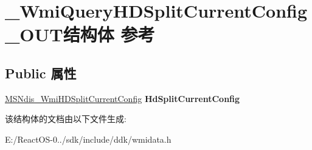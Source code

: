 \hypertarget{struct___wmi_query_h_d_split_current_config___o_u_t}{}\section{\+\_\+\+Wmi\+Query\+H\+D\+Split\+Current\+Config\+\_\+\+O\+U\+T结构体 参考}
\label{struct___wmi_query_h_d_split_current_config___o_u_t}
\subsection*{Public 属性}
\begin{DoxyCompactItemize}
\item 
\mbox{\label{struct___wmi_query_h_d_split_current_config___o_u_t_a3103e19f105575b0317ad8fd4fad4f9a}} 
\hyperlink{struct___m_s_ndis___wmi_h_d_split_current_config}{M\+S\+Ndis\+\_\+\+Wmi\+H\+D\+Split\+Current\+Config} {\bfseries Hd\+Split\+Current\+Config}
\end{DoxyCompactItemize}


该结构体的文档由以下文件生成\+:\begin{DoxyCompactItemize}
\item 
E\+:/\+React\+O\+S-\/0../sdk/include/ddk/wmidata.\+h\end{DoxyCompactItemize}
